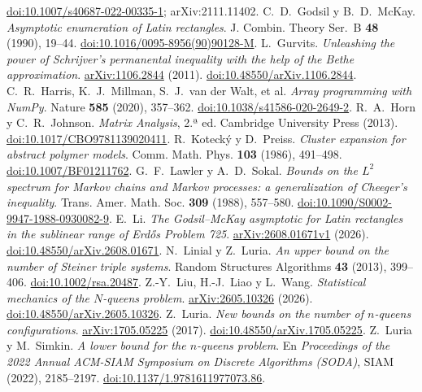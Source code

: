\href{https://doi.org/10.1007/s40687-022-00335-1}{doi:10.1007/s40687-022-00335-1}; arXiv:2111.11402.
C.~D.~Godsil y B.~D.~McKay.
\emph{Asymptotic enumeration of Latin rectangles}.
J. Combin. Theory Ser.~B \textbf{48} (1990), 19--44.
\href{https://doi.org/10.1016/0095-8956(90)90128-M}{doi:10.1016/0095-8956(90)90128-M}.
L.~Gurvits.
\emph{Unleashing the power of Schrijver's permanental inequality with the help of the Bethe
approximation}.
\href{https://arxiv.org/abs/1106.2844}{arXiv:1106.2844} (2011).
\href{https://doi.org/10.48550/arXiv.1106.2844}{doi:10.48550/arXiv.1106.2844}.
C.~R.~Harris, K.~J.~Millman, S.~J.~van der Walt, et al.
\emph{Array programming with NumPy}.
Nature \textbf{585} (2020), 357--362.
\href{https://doi.org/10.1038/s41586-020-2649-2}{doi:10.1038/s41586-020-2649-2}.
R.~A.~Horn y C.~R.~Johnson.
\emph{Matrix Analysis}, 2.ª ed.
Cambridge University Press (2013).
\href{https://doi.org/10.1017/CBO9781139020411}{doi:10.1017/CBO9781139020411}.
R.~Kotecký y D.~Preiss.
\emph{Cluster expansion for abstract polymer models}.
Comm. Math. Phys. \textbf{103} (1986), 491--498.
\href{https://doi.org/10.1007/BF01211762}{doi:10.1007/BF01211762}.
G.~F.~Lawler y A.~D.~Sokal.
\emph{Bounds on the $L^2$ spectrum for Markov chains and Markov processes: a generalization of
Cheeger's inequality}.
Trans. Amer. Math. Soc. \textbf{309} (1988), 557--580.
\href{https://doi.org/10.1090/S0002-9947-1988-0930082-9}{doi:10.1090/S0002-9947-1988-0930082-9}.
E.~Li.
\emph{The Godsil--McKay asymptotic for Latin rectangles in the sublinear range of
Erd\H{o}s Problem 725}.
\href{https://arxiv.org/abs/2608.01671v1}{arXiv:2608.01671v1} (2026).
\href{https://doi.org/10.48550/arXiv.2608.01671}{doi:10.48550/arXiv.2608.01671}.
N.~Linial y Z.~Luria.
\emph{An upper bound on the number of Steiner triple systems}.
Random Structures Algorithms \textbf{43} (2013), 399--406.
\href{https://doi.org/10.1002/rsa.20487}{doi:10.1002/rsa.20487}.
Z.-Y.~Liu, H.-J.~Liao y L.~Wang.
\emph{Statistical mechanics of the $N$-queens problem}.
\href{https://arxiv.org/abs/2605.10326}{arXiv:2605.10326} (2026).
\href{https://doi.org/10.48550/arXiv.2605.10326}{doi:10.48550/arXiv.2605.10326}.
Z.~Luria.
\emph{New bounds on the number of $n$-queens configurations}.
\href{https://arxiv.org/abs/1705.05225}{arXiv:1705.05225} (2017).
\href{https://doi.org/10.48550/arXiv.1705.05225}{doi:10.48550/arXiv.1705.05225}.
Z.~Luria y M.~Simkin.
\emph{A lower bound for the $n$-queens problem}.
En \emph{Proceedings of the 2022 Annual ACM-SIAM Symposium on Discrete Algorithms (SODA)}, SIAM
(2022), 2185--2197.
\href{https://doi.org/10.1137/1.9781611977073.86}{doi:10.1137/1.9781611977073.86}.
